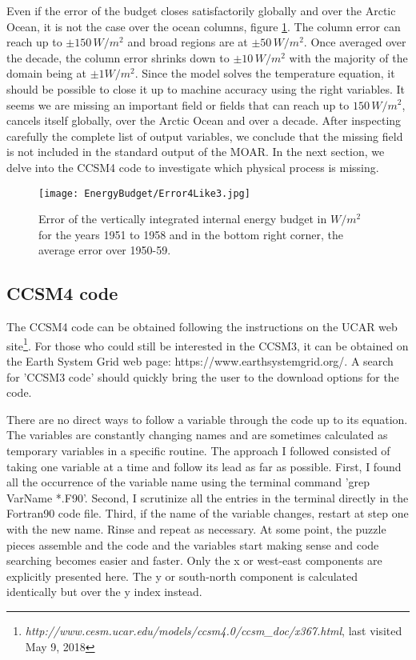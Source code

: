 Even if the error of the budget closes satisfactorily globally and over the Arctic Ocean, it is not the case over the ocean columns, figure \ref{column4l3}. The column error can reach up to $\pm 150\, W/m^2$ and broad regions are at $\pm 50 \, W/m^2$. Once averaged over the decade, the column error shrinks down to $\pm 10 \, W/m^2$ with the majority of the domain being at $\pm 1 W/m^2$. Since the model solves the temperature equation, it should be possible to close it up to machine accuracy using the right variables. It seems we are missing an important field or fields that can reach up to $150\, W/m^2$, cancels itself globally, over the Arctic Ocean and over a decade. After inspecting carefully the complete list of output variables, we conclude that the missing field is not included in the standard output of the MOAR. In the next section, we delve into the CCSM4 code to investigate which physical process is missing. 

\begin{figure}
\center
\texttt{[image: EnergyBudget/Error4Like3.jpg]}
\caption{Error of the vertically integrated internal energy budget in $W/m^2$ for the years 1951 to 1958 and in the bottom right corner, the average error over 1950-59.}
\label{column4l3}
\end{figure}

\subsection{CCSM4 code}\label{code}

The CCSM4 code can be obtained following the instructions on the UCAR web site\footnote{\textit{http://www.cesm.ucar.edu/models/ccsm4.0/ccsm\_doc/x367.html}, last visited May 9, 2018}. For those who could still be interested in the CCSM3, it can be obtained on the Earth System Grid web page: https://www.earthsystemgrid.org/. A search for 'CCSM3 code' should quickly bring the user to the download options for the code.

There are no direct ways to follow a variable through the code up to its equation. The variables are constantly changing names and are sometimes calculated as temporary variables in a specific routine. The approach I followed consisted of taking one variable at a time and follow its lead as far as possible. First, I found all the occurrence of the variable name using the terminal command 'grep VarName *.F90'. Second, I scrutinize all the entries in the terminal directly in the Fortran90 code file. Third, if the name of the variable changes, restart at step one with the new name. Rinse and repeat as necessary.  At some point, the puzzle pieces assemble and the code and the variables start making sense and code searching becomes easier and faster. Only the x or west-east components are explicitly presented here. The y or south-north component is calculated identically but over the y index instead.  

